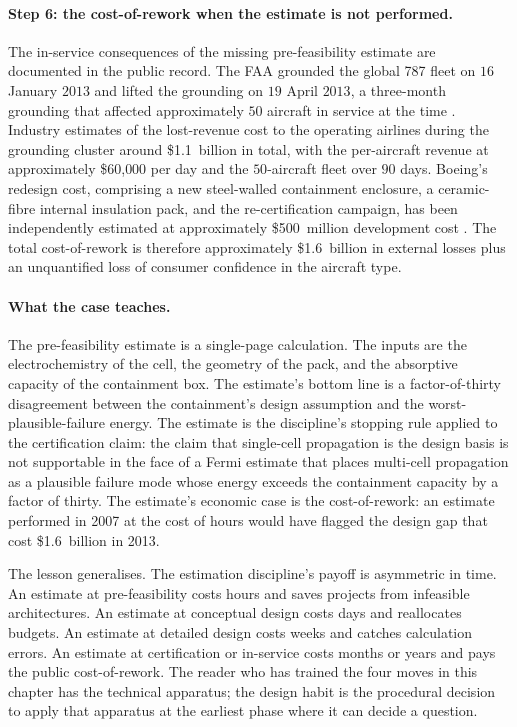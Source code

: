 \paragraph{Step 6: the cost-of-rework when the estimate is not
performed.}
The in-service consequences of the missing pre-feasibility
estimate are documented in the public record. The FAA grounded
the global 787 fleet on $16$ January $2013$ and lifted the
grounding on $19$ April $2013$, a three-month grounding that
affected approximately $50$ aircraft in service at the time
\cite{web:ch09t3-faa-787-airworthiness-2013}. Industry
estimates of the lost-revenue cost to the operating airlines
during the grounding cluster around \$1.1~billion in total,
with the per-aircraft revenue at approximately \$60{,}000 per
day and the $50$-aircraft fleet over $90$ days. Boeing's
redesign cost, comprising a new steel-walled containment
enclosure, a ceramic-fibre internal insulation pack, and the
re-certification campaign, has been independently estimated at
approximately \$500~million development cost
\cite{acc:ntsb-aar14-01-787-battery}. The total
cost-of-rework is therefore approximately \$1.6~billion in
external losses plus an unquantified loss of consumer
confidence in the aircraft type.

\paragraph{What the case teaches.}
The pre-feasibility estimate is a single-page calculation. The
inputs are the electrochemistry of the cell, the geometry of
the pack, and the absorptive capacity of the containment box.
The estimate's bottom line is a factor-of-thirty disagreement
between the containment's design assumption and the
worst-plausible-failure energy. The estimate is the
discipline's stopping rule applied to the certification claim:
the claim that single-cell propagation is the design basis is
not supportable in the face of a Fermi estimate that places
multi-cell propagation as a plausible failure mode whose
energy exceeds the containment capacity by a factor of thirty.
The estimate's economic case is the cost-of-rework: an
estimate performed in 2007 at the cost of hours would have
flagged the design gap that cost \$1.6~billion in 2013.

The lesson generalises. The estimation discipline's payoff is
asymmetric in time. An estimate at pre-feasibility costs
hours and saves projects from infeasible architectures. An
estimate at conceptual design costs days and reallocates
budgets. An estimate at detailed design costs weeks and
catches calculation errors. An estimate at certification or
in-service costs months or years and pays the public
cost-of-rework. The reader who has trained the four moves in
this chapter has the technical apparatus; the design habit is
the procedural decision to apply that apparatus at the
earliest phase where it can decide a question.

